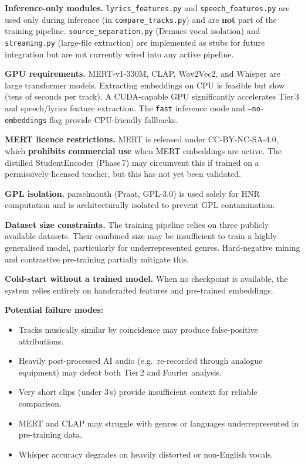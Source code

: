 \documentclass[11pt,a4paper]{article}
\begin{document}
\textbf{Inference-only modules.} \texttt{lyrics\_features.py} and \texttt{speech\_features.py} are used only during inference (in \texttt{compare\_tracks.py}) and are \textbf{not} part of the training pipeline. \texttt{source\_separation.py} (Demucs vocal isolation) and \texttt{streaming.py} (large-file extraction) are implemented as stubs for future integration but are not currently wired into any active pipeline.

\textbf{GPU requirements.} MERT-v1-330M, CLAP, Wav2Vec2, and Whisper are large transformer models. Extracting embeddings on CPU is feasible but slow (tens of seconds per track). A CUDA-capable GPU significantly accelerates Tier\,3 and speech/lyrics feature extraction. The \texttt{fast} inference mode and \texttt{--no-embeddings} flag provide CPU-friendly fallbacks.

\textbf{MERT licence restrictions.} MERT is released under CC-BY-NC-SA-4.0, which \textbf{prohibits commercial use} when MERT embeddings are active. The distilled StudentEncoder (Phase\,7) may circumvent this if trained on a permissively-licensed teacher, but this has not yet been validated.

\textbf{GPL isolation.} parselmouth (Praat, GPL-3.0) is used solely for HNR computation and is architecturally isolated to prevent GPL contamination.

\textbf{Dataset size constraints.} The training pipeline relies on three publicly available datasets. Their combined size may be insufficient to train a highly generalised model, particularly for underrepresented genres. Hard-negative mining and contrastive pre-training partially mitigate this.

\textbf{Cold-start without a trained model.} When no checkpoint is available, the system relies entirely on handcrafted features and pre-trained embeddings.

\textbf{Potential failure modes:}
\begin{itemize}[nosep]
  \item Tracks musically similar by coincidence may produce false-positive attributions.
  \item Heavily post-processed AI audio (e.g.\ re-recorded through analogue equipment) may defeat both Tier\,2 and Fourier analysis.
  \item Very short clips (under 3\,s) provide insufficient context for reliable comparison.
  \item MERT and CLAP may struggle with genres or languages underrepresented in pre-training data.
  \item Whisper accuracy degrades on heavily distorted or non-English vocals.
\end{itemize}
\end{document}
